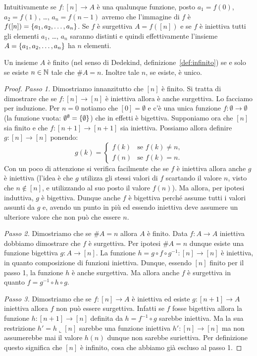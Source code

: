 Intuitivamente se $f\colon [n]\to A$ è una qualunque funzione, 
posto $a_1=f(0)$, $a_2=f(1)$, \dots, $a_{n}=f(n-1)$ 
avremo che l'immagine di $f$ è $f([n]) = {\left\{ a_1,a_2,\dots,a_n \right\}}$.
Se $f$ è surgettiva $A=f([n])$ e se $f$ è iniettiva 
tutti gli elementi $a_1$, \dots, $a_n$ saranno distinti
e quindi effettivamente l'insieme $A={\left\{ a_1,a_2,\dots,a_n \right\}}$
ha $n$ elementi.

\begin{theorem}
  \label{th:cardinali_finiti}%
Un insieme $A$ è finito
(nel senso di Dedekind, definizione~\ref{def:infinito})
se e solo se esiste $n\in {\mathbb N}$ tale che $\#A = n$.
Inoltre tale $n$, se esiste, è unico.
\end{theorem}
\begin{proof}
\emph{Passo 1.} Dimostriamo innanzitutto che $[n]$ è finito.
Si tratta di dimostrare che se $f\colon [n]\to [n]$ è iniettiva allora è anche surgettiva.
Lo facciamo per induzione. 
Per $n=0$ notiamo che $[0]=\emptyset$ e c'è una unica funzione $f\colon \emptyset \to \emptyset$
(la funzione vuota: $\emptyset^\emptyset = {\left\{ \emptyset \right\}}$)
che in effetti è bigettiva.
Supponiamo ora che $[n]$ sia finito e che $f\colon [n+1]\to [n+1]$ sia iniettiva.
Possiamo allora definire $g\colon[n]\to[n]$ ponendo:
\[
  g(k) = \begin{cases}
    f(k) & \text{se $f(k)\neq n$,}\\
    f(n) & \text{se $f(k)=n$.}
  \end{cases}
\]
Con un poco di attenzione si verifica facilmente che se $f$ è iniettiva allora anche $g$ è iniettiva
(l'idea è che $g$ utilizza gli stessi valori di $f$ scartando il valore $n$, visto che $n\not \in [n]$, 
e utilizzando al suo posto il valore $f(n)$).
Ma allora, per ipotesi induttiva, $g$ è bigettiva.
Dunque anche $f$ è bigettiva perché assume tutti i valori assunti da $g$  
e, avendo un punto in più ed essendo iniettiva deve assumere un ulteriore valore che non può 
che essere $n$.

\emph{Passo 2.}
Dimostriamo che se $\#A=n$ allora $A$ è finito.
Data $f\colon A\to A$ iniettiva dobbiamo dimostrare che $f$ è surgettiva.
Per ipotesi $\#A=n$ dunque esiste una funzione bigettiva $g\colon A\to [n]$.
La funzione $h=g\circ f\circ g^{-1}\colon [n]\to [n]$ è iniettiva, in quanto composizione di funzioni iniettiva.
Dunque, essendo $[n]$ finito per il passo 1, la funzione $h$ è anche surgettiva.
Ma allora anche $f$ è surgettiva in quanto $f=g^{-1}\circ h\circ g$.

\emph{Passo 3.} Dimostriamo che se $f\colon[n]\to A$ è iniettiva
ed esiste $g\colon[n+1]\to A$ iniettiva allora $f$ non può 
essere surgettiva.
Infatti se $f$ fosse bigettiva allora la funzione
$h\colon [n+1]\to [n]$ definita da $h=f^{-1}\circ g$ 
sarebbe iniettiva.
Ma la sua restrizione $h'=h \llcorner [n]$ sarebbe una funzione
iniettiva $h'\colon[n]\to[n]$ ma non assumerebbe mai il valore 
$h(n)$ dunque non sarebbe suriettiva.
Per definizione questo significa che $[n]$ è infinito, 
cosa che abbiamo già escluso al passo 1.


\end{proof}
